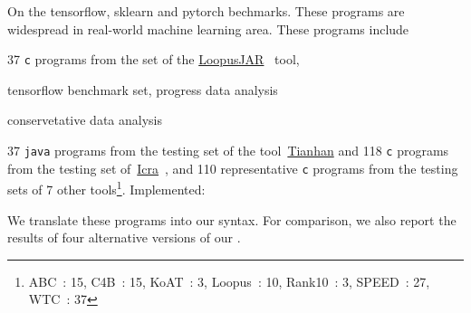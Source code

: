 On the tensorflow, sklearn and pytorch bechmarks. These programs are widespread in real-world machine learning area.
These programs include  


37 {\tt c} programs 
from the set of the \hyperlink{https://forsyte.at/static/people/sinn/loopusJAR/index.html}{LoopusJAR}~\cite{BenchmarkLoopus} tool,

tensorflow benchmark set, 
progress data analysis

conservetative data analysis

37 {\tt java} programs from the testing set of the tool~\hyperlink{https://zenodo.org/record/5140586\#.Y5pBoC-B1QI}{Tianhan}\cite{BenchmarkTianhan,LuCT21} 
and 118 {\tt c} programs from the testing set of~\hyperlink{https://github.com/icra-team/icra}{Icra}~\cite{BenchmarkIcra,KincaidBCR19,CyphertBKR19}, and 110 representative {\tt c} programs from the testing sets of 7 other tools\footnote{ABC~\cite{BenchmarkABC}: 15, C4B~\cite{BenchmarkC4B}: 15, KoAT~\cite{BenchmarkKoAt}: 3, Loopus~\cite{BenchmarkLoopus}: 10, Rank10~\cite{BenchmarkRank}: 3, SPEED~\cite{GulwaniJK09,GulwaniZ10,GulwaniMC09}: 27, WTC~\cite{BenchmarkLoopus}: 37}.
%
Implemented:

We translate these programs into our syntax.
For comparison, we also report the results of 
four alternative versions of our \THESYSTEM.